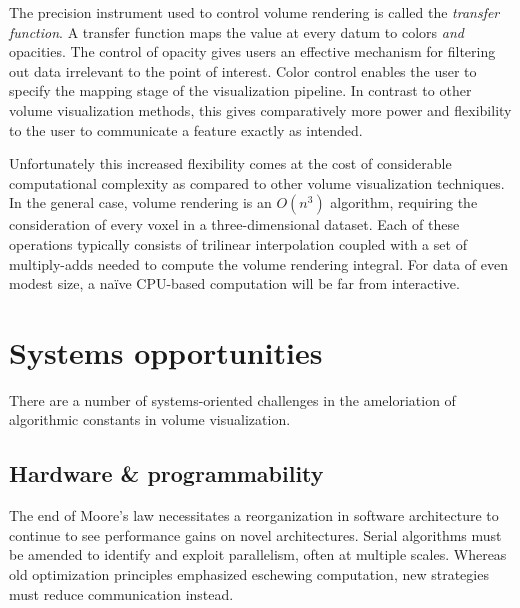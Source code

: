 
The precision instrument used to control volume rendering is called the
\emph{transfer function}.  A transfer function maps the value at every
datum to colors \emph{and} opacities.  The control of opacity gives
users an effective mechanism for filtering out data irrelevant to the
point of interest.  Color control enables the user to specify the
mapping stage of the visualization pipeline.  In contrast to other
volume visualization methods, this gives comparatively more power and
flexibility to the user to communicate a feature exactly as intended.

Unfortunately this increased flexibility comes at the cost of
considerable computational complexity as compared to other volume
visualization techniques.  In the general case, volume rendering is an
$O(n^3)$ algorithm, requiring the consideration of every voxel in a
three-dimensional dataset.  Each of these operations typically consists
of trilinear interpolation coupled with a set of multiply-adds needed
to compute the volume rendering integral.  For data of even modest
size, a na\"ive CPU-based computation will be far from interactive.



\section{Systems opportunities}

There are a number of systems-oriented challenges in the ameloriation of
algorithmic constants in volume visualization.

\subsection{Hardware \& programmability}

The end of Moore's law necessitates a reorganization in software
architecture to continue to see performance gains on novel
architectures.  Serial algorithms must be amended to identify
and exploit parallelism, often at multiple scales.  Whereas old
optimization principles emphasized eschewing computation, new
strategies must reduce communication instead.

